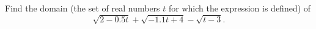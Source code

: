 Find the domain (the set of real numbers $t$ for which the expression is defined) of
\[
\sqrt{2-0.5t}+\sqrt{-1.1t+4}-\sqrt{t-3}.
\]
